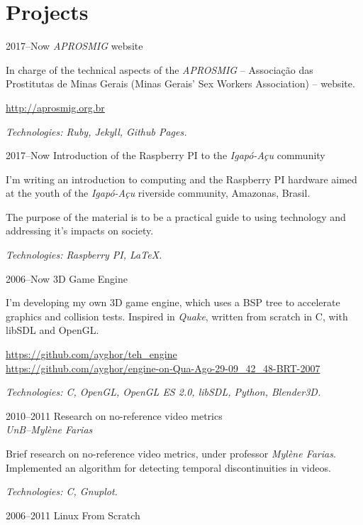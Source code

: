 \documentclass[a4paper]{simplecv}
\begin{document}
\section{Projects}

\begin{topic}
\item[2017--Now] \emph{APROSMIG} website

	In charge of the technical aspects of the \emph{APROSMIG} -- Associação
	das Prostitutas de Minas Gerais (Minas Gerais' Sex Workers Association)
	-- website.

	{\scriptsize\url{http://aprosmig.org.br}}

	{\em\scriptsize Technologies: Ruby, Jekyll, Github Pages.}

\item[2017--Now] Introduction of the Raspberry PI to the \emph{Igapó-Açu} community

	I'm writing an introduction to computing and the Raspberry PI hardware
	aimed at the youth of the \emph{Igapó-Açu} riverside community,
	Amazonas, Brasil.

	The purpose of the material is to be a practical guide to using
	technology and addressing it's impacts on society.

	{\em\scriptsize Technologies: Raspberry PI, \LaTeX{}.}

\item[2006--Now] 3D Game Engine

	I'm developing my own 3D game engine, which uses a BSP tree to
	accelerate graphics and collision tests. Inspired in \emph{Quake},
	written from scratch in C, with libSDL and OpenGL.

	{\scriptsize\url{https://github.com/ayghor/teh_engine}}\\
	{\scriptsize\url{https://github.com/ayghor/engine-on-Qua-Ago-29-09\_42\_48-BRT-2007}}

	{\em\scriptsize Technologies: C, OpenGL, OpenGL ES 2.0, libSDL, Python,
	Blender3D.}

\item[2010--2011] Research on no-reference video metrics\\
	{\em\small UnB--Mylène Farias}

	Brief research on no-reference video metrics, under professor
	\emph{Mylène Farias}. Implemented an algorithm for detecting temporal
	discontinuities in videos.

	{\em\scriptsize Technologies: C, Gnuplot.}

\item[2006--2011] Linux From Scratch


\end{topic}
\end{document}
